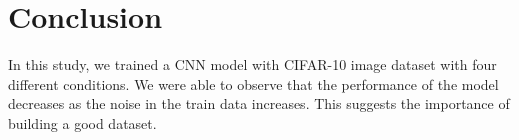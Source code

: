 \documentclass[10pt,twocolumn,letterpaper]{article}
\begin{document}
\section{Conclusion}
\label{sec:conclusion}
In this study, we trained a CNN model with CIFAR-10 image dataset with four different conditions. We were able to observe that the performance of the model decreases as the noise in the train data increases. This suggests the importance of building a good dataset.




{\small


}
\end{document}
